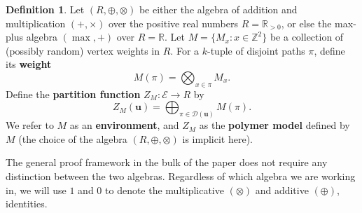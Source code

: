 \documentclass[aop, preprint]{imsart}
\theoremstyle{plain}
\theoremstyle{definition}
\newtheorem{definition}[theorem]{Definition}
\theoremstyle{plain}
\newcommand{\scrE}{\mathcal{E}}
\newcommand{\scrD}{\mathcal{D}}
\newcommand{\Z}{\mathds{Z}}
\newcommand{\R}{\mathds{R}}
\newcommand{\X}{\times}
\newcommand{\bu}{\mathbf{u}}
\begin{document}
\begin{definition}
	\label{D:polymer}
	Let $(R, \oplus, \otimes)$ be either the algebra of addition and multiplication $(+, \X)$ over the positive real numbers $R = \R_{> 0}$, or else the max-plus algebra $(\max, +)$ over $R = \R$.
	Let $M = \{M_x : x \in \Z^2 \}$ be a collection of (possibly random) vertex weights in $R$. For a $k$-tuple of disjoint paths $\pi$, define its \textbf{weight}
	$$
	M(\pi) = \bigotimes_{x \in \pi} M_x.
	$$
	Define the \textbf{partition function} $Z_M:\scrE \to R$ by
	$$
	Z_M(\bu) = \bigoplus_{\pi \in \scrD(\bu)} M(\pi).
	$$
	We refer to $M$ as an \textbf{environment}, and $Z_M$ as the \textbf{polymer model} defined by $M$ (the choice of the algebra $(R, \oplus, \otimes)$ is implicit here). 
\end{definition}

The general proof framework in the bulk of the paper does not require any distinction between the two algebras. Regardless of which algebra we are working in, we will use $1$ and $0$ to denote the multiplicative $(\otimes)$ and additive $(\oplus)$, identities. 
\end{document}
